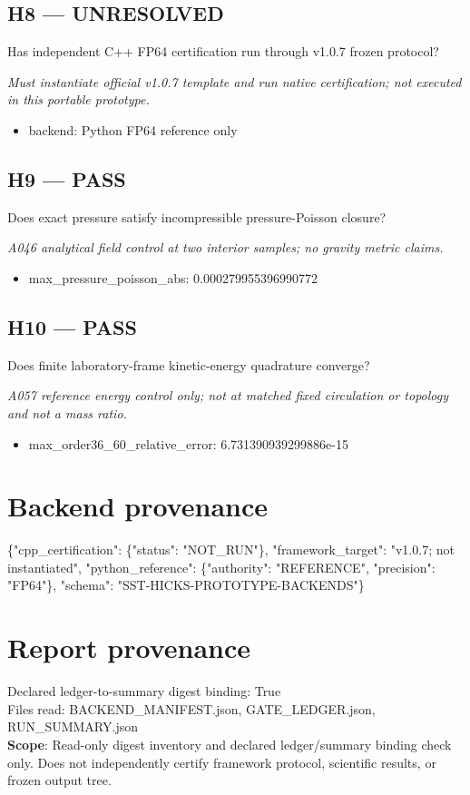 \documentclass[10pt,a4paper]{article}
\begin{document}
\subsection*{H8 --- UNRESOLVED}
Has independent C++ FP64 certification run through v1.0.7 frozen protocol?
\par\textit{Must instantiate official v1.0.7 template and run native certification; not executed in this portable prototype.}\par
\begin{itemize}
\item backend: Python FP64 reference only
\end{itemize}
\subsection*{H9 --- PASS}
Does exact pressure satisfy incompressible pressure-Poisson closure?
\par\textit{A046 analytical field control at two interior samples; no gravity metric claims.}\par
\begin{itemize}
\item max\_pressure\_poisson\_abs: 0.000279955396990772
\end{itemize}
\subsection*{H10 --- PASS}
Does finite laboratory-frame kinetic-energy quadrature converge?
\par\textit{A057 reference energy control only; not at matched fixed circulation or topology and not a mass ratio.}\par
\begin{itemize}
\item max\_order36\_60\_relative\_error: 6.731390939299886e-15
\end{itemize}
\section*{Backend provenance}
\{"cpp\_certification": \{"status": "NOT\_RUN"\}, "framework\_target": "v1.0.7; not instantiated", "python\_reference": \{"authority": "REFERENCE", "precision": "FP64"\}, "schema": "SST-HICKS-PROTOTYPE-BACKENDS"\}
\section*{Report provenance}
Declared ledger-to-summary digest binding: True\\
Files read: BACKEND\_MANIFEST.json, GATE\_LEDGER.json, RUN\_SUMMARY.json\\
\textbf{Scope}: Read-only digest inventory and declared ledger/summary binding check only. Does not independently certify framework protocol, scientific results, or frozen output tree.
\end{document}
